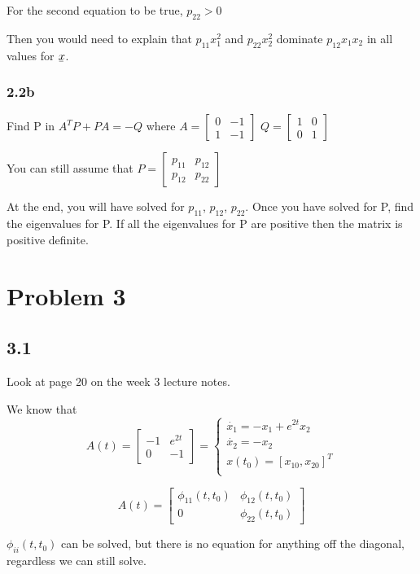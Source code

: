 \documentclass[12pt]{article}
\newcommand{\ubar}[1]{\underaccent{\bar}{#1}}
\begin{document}
For the second equation to be true, $p_{22}>0$ 

Then you would need to explain that $p_{11}x_{1}^2$ and $p_{22}x_{2}^2$ dominate $p_{12}x_1x_2$ in all values for $\ubar{x}$. 

\subsubsection*{2.2b}
Find P in $A^TP+PA=-Q$ where 
$A=\begin{bmatrix} 0 & -1 \\
1 & -1
\end{bmatrix}$
$Q=\begin{bmatrix} 1 & 0 \\
0 & 1
\end{bmatrix}$

You can still assume that $P=\begin{bmatrix} p_{11} & p_{12} \\
p_{12} & p_{22}
\end{bmatrix}$

At the end, you will have solved for $p_{11}$, $p_{12}$, $p_{22}$. Once you have solved for P, find the eigenvalues for P. If all the eigenvalues for P are positive then the matrix is positive definite. 

\section*{Problem 3}
\subsection*{3.1}
Look at page 20 on the week 3 lecture notes. 

We know that 
$$A(t)=\begin{bmatrix} -1 & e^{2t} \\
0 & -1
\end{bmatrix}=\begin{cases}\dot{x_1}=-x_1+e^{2t}x_2\\ 
\dot{x_2}=-x_2\\ 
x(t_0)=[x_{10}, x_{20}]^T\\
\end{cases}$$ 

$$A(t)=\begin{bmatrix} \phi_{11}(t,t_0) & \phi_{12}(t,t_0) \\
0 & \phi_{22}(t,t_0)
\end{bmatrix}$$

$\phi_{ii}(t,t_0)$ can be solved, but there is no equation for anything off the diagonal, regardless we can still solve.
\end{document}
